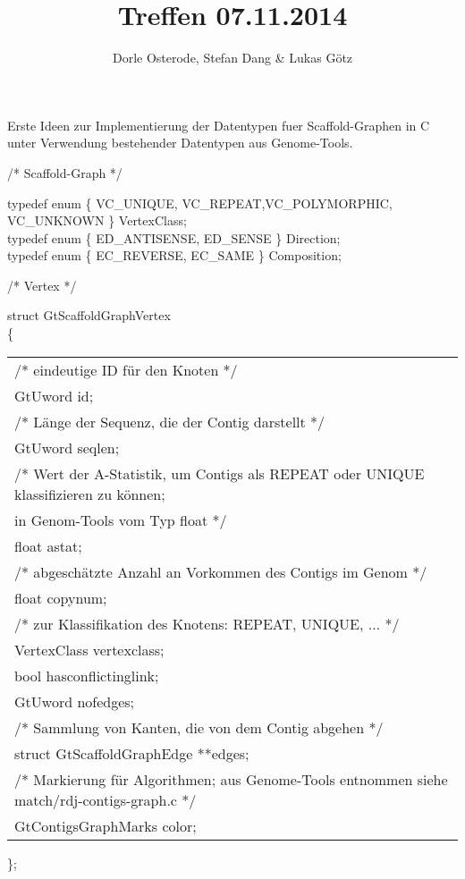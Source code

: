 \documentclass[a4paper,10pt,parskip]{scrartcl}
\title{Treffen 07.11.2014}
\author{Dorle Osterode, Stefan Dang \& Lukas Götz}
\begin{document}
\maketitle{}

Erste Ideen zur Implementierung der Datentypen fuer Scaffold-Graphen in C unter
Verwendung bestehender Datentypen aus Genome-Tools.

/* Scaffold-Graph */

typedef enum \{ VC\_UNIQUE, VC\_REPEAT,VC\_POLYMORPHIC, VC\_UNKNOWN \}
	 	VertexClass;\\
typedef enum \{ ED\_ANTISENSE, ED\_SENSE \} Direction;\\
typedef enum \{ EC\_REVERSE, EC\_SAME \} Composition;

/* Vertex */

struct GtScaffoldGraphVertex\\
\{\\
\begin{tabular}{l}
  /* eindeutige ID für den Knoten */\\
  GtUword id;\\
  /* Länge der Sequenz, die der Contig darstellt */\\
  GtUword seqlen;\\ 
  /* Wert der A-Statistik, um Contigs als REPEAT oder UNIQUE
     klassifizieren zu können;\\
     in Genom-Tools vom Typ float */\\
  float astat;\\	
  /* abgeschätzte Anzahl an Vorkommen des Contigs im Genom */\\
  float copynum;\\  
  /* zur Klassifikation des Knotens: REPEAT, UNIQUE, ... */\\
  VertexClass vertexclass;\\ 
  bool hasconflictinglink;\\
  GtUword nofedges;\\
  /* Sammlung von Kanten, die von dem Contig abgehen */\\
  struct GtScaffoldGraphEdge   **edges;\\  
  /* Markierung für Algorithmen; aus Genome-Tools entnommen siehe
  match/rdj-contigs-graph.c */\\
  GtContigsGraphMarks color;\\ 	  
\end{tabular}
\};
\end{document}
